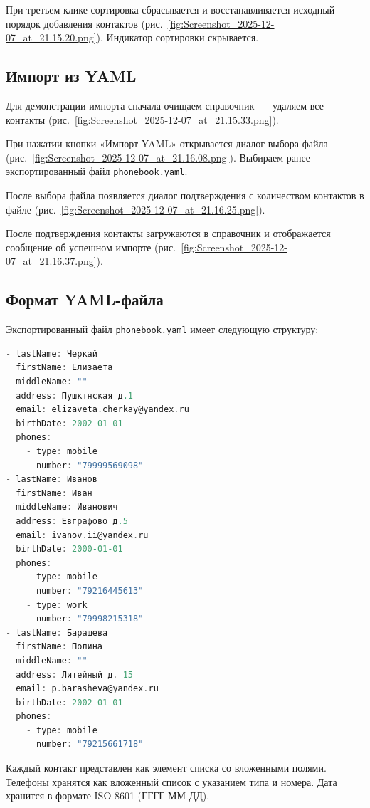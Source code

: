 При третьем клике сортировка сбрасывается и восстанавливается исходный порядок добавления контактов (рис.~\ref{fig:Screenshot_2025-12-07_at_21.15.20.png}). Индикатор сортировки скрывается.


\subsection{Импорт из YAML}

Для демонстрации импорта сначала очищаем справочник~--- удаляем все контакты (рис.~\ref{fig:Screenshot_2025-12-07_at_21.15.33.png}).


При нажатии кнопки «Импорт YAML» открывается диалог выбора файла (рис.~\ref{fig:Screenshot_2025-12-07_at_21.16.08.png}). Выбираем ранее экспортированный файл \texttt{phonebook.yaml}.


После выбора файла появляется диалог подтверждения с количеством контактов в файле (рис.~\ref{fig:Screenshot_2025-12-07_at_21.16.25.png}).


После подтверждения контакты загружаются в справочник и отображается сообщение об успешном импорте (рис.~\ref{fig:Screenshot_2025-12-07_at_21.16.37.png}).


\subsection{Формат YAML-файла}

Экспортированный файл \texttt{phonebook.yaml} имеет следующую структуру:

\begin{lstlisting}[language=C, caption=Содержимое файла phonebook.yaml]
- lastName: Черкай
  firstName: Елизаета
  middleName: ""
  address: Пушктнская д.1
  email: elizaveta.cherkay@yandex.ru
  birthDate: 2002-01-01
  phones:
    - type: mobile
      number: "79999569098"
- lastName: Иванов
  firstName: Иван
  middleName: Иванович
  address: Евграфово д.5
  email: ivanov.ii@yandex.ru
  birthDate: 2000-01-01
  phones:
    - type: mobile
      number: "79216445613"
    - type: work
      number: "79998215318"
- lastName: Барашева
  firstName: Полина
  middleName: ""
  address: Литейный д. 15
  email: p.barasheva@yandex.ru
  birthDate: 2002-01-01
  phones:
    - type: mobile
      number: "79215661718"
\end{lstlisting}

Каждый контакт представлен как элемент списка со вложенными полями. Телефоны хранятся как вложенный список с указанием типа и номера. Дата хранится в формате ISO 8601 (ГГГГ-ММ-ДД).